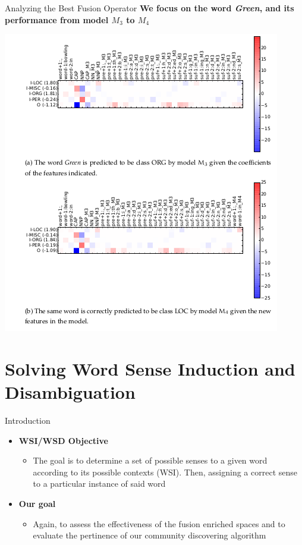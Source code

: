 \documentclass[10pt,xcolor=table]{beamer}
\begin{document}
\begin{frame}{Analyzing the Best Fusion Operator}
\large \textbf{We focus on the word \textit{Green}, and its performance from model $M_3$ to $M_4$}
\begin{center}
\includegraphics[width=0.6\linewidth]{image2/Chapitre4/fanalm3_m4.png}
\end{center}
\end{frame}

\section[Applications to NLP]{Solving Word Sense Induction and Disambiguation}

\begin{frame}{Introduction}
\begin{itemize}[<+- | alert@+>]
\item \large \textbf{WSI/WSD Objective}
\begin{itemize}
\item  The goal is to determine a set of possible senses to a given word according to its possible contexts (WSI). Then, assigning a correct sense to a particular instance of said word

\end{itemize}
\item \large \textbf{Our goal}
\begin{itemize}
\item Again, to assess the effectiveness of the fusion enriched spaces and to evaluate the pertinence of our community discovering algorithm
\end{itemize}

\end{itemize}
\end{frame}
\end{document}
